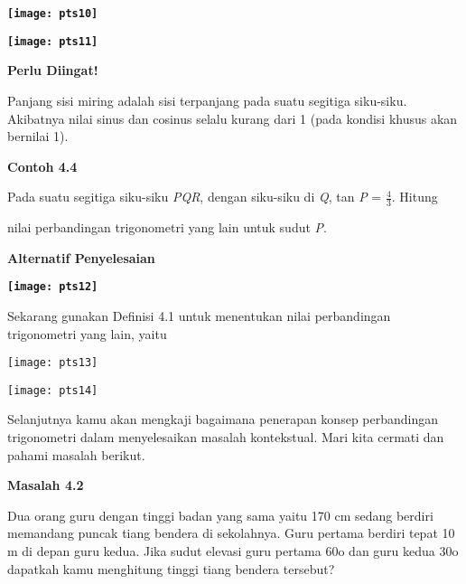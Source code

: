 \documentclass[11pt,fleqn]{book} %
\begin{document}
\begin{myEnumerate}
\begin{itemize}
\noindent \textbf{}

\noindent \textbf{\texttt{[image: pts10]}}

\noindent \textbf{\texttt{[image: pts11]}}

\noindent \textbf{}

\noindent \textbf{Perlu Diingat!}

\noindent \textbf{}

\noindent Panjang sisi miring adalah sisi terpanjang pada suatu segitiga siku-siku. Akibatnya nilai sinus dan cosinus selalu kurang dari 1 (pada kondisi khusus akan bernilai 1).

\noindent \textbf{}

\noindent \textbf{Contoh 4.4}

\noindent \textbf{}

\noindent Pada suatu segitiga siku-siku \textit{PQR}, dengan siku-siku di \textit{Q}, tan \textit{P }= $\frac{4}{3}$. Hitung

\noindent nilai perbandingan trigonometri yang lain untuk sudut \textit{P}. \textbf{}

\noindent 

\noindent \textbf{Alternatif Penyelesaian}

\noindent \textbf{}

\noindent \textbf{\texttt{[image: pts12]}}

\noindent 

\noindent Sekarang gunakan Definisi 4.1 untuk menentukan nilai perbandingan trigonometri yang lain, yaitu

\noindent 

\noindent \texttt{[image: pts13]}

\noindent \texttt{[image: pts14]}

\noindent 

\noindent Selanjutnya kamu akan mengkaji bagaimana penerapan konsep perbandingan trigonometri dalam menyelesaikan masalah kontekstual. Mari kita cermati dan pahami masalah berikut.

\noindent 

\noindent \textbf{Masalah 4.2}

\noindent \textbf{}

\noindent Dua orang guru dengan tinggi badan yang sama yaitu 170 cm sedang berdiri memandang puncak tiang bendera di sekolahnya. Guru pertama berdiri tepat 10 m di depan guru kedua. Jika sudut elevasi guru pertama 60o dan guru kedua 30o dapatkah kamu menghitung tinggi tiang bendera tersebut?


\end{itemize}
\end{myEnumerate}
\end{document}
